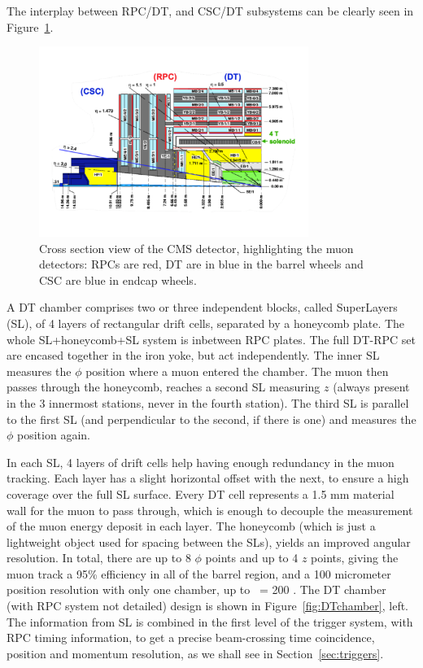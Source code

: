 
The interplay between RPC/DT, and CSC/DT subsystems can be clearly
seen in Figure~\ref{fig:muonsystem}.


\begin{figure}[htb]
  \begin{center}
    \includegraphics[width=0.78\textwidth]{Chapters/xLHCMS/muonsystem.pdf}
    \caption{Cross section view of the CMS detector, highlighting the
      muon detectors: RPCs are red, DT are in blue in the barrel
      wheels and CSC are blue in endcap wheels.}
    \label{fig:muonsystem}
  \end{center}
\end{figure}


A DT chamber comprises two or three independent blocks, called SuperLayers (SL), of
4 layers of rectangular drift cells, separated by a honeycomb
plate. The whole SL+honeycomb+SL system is inbetween RPC
plates. The full DT-RPC set are encased together in the iron yoke, but
act independently. The inner SL measures the $\phi$ position where a
muon entered the chamber. The muon then passes through the honeycomb,
reaches a second SL measuring $z$  (always
present in the 3 innermost stations, never in the fourth station). The
third SL is parallel to the first SL (and perpendicular to the second,
if there is one) and measures the $\phi$ position again.


In each SL, 4 layers of drift cells help having enough redundancy in
the muon tracking. Each layer has a slight horizontal offset with the
next, to ensure a high coverage over the full SL surface. Every DT
cell represents a 1.5 mm material wall for the muon to pass through,
which is enough to decouple the measurement of the muon energy deposit
in each layer. The honeycomb (which is just a
lightweight object used for spacing between the SLs), yields an
improved angular resolution. In total, there are up to 8 $\phi$ points
and up to 4 $z$ points, giving the muon track a 95\% efficiency in all
of the barrel region, and a 100 micrometer
position resolution with only one chamber, up to \pt~= 200 \GeVc. The
DT chamber (with RPC system not detailed) design is shown in
Figure~\ref{fig:DTchamber}, left. The
information from SL is combined in the first level of the trigger
system, with RPC timing information, to get a precise beam-crossing
time coincidence, position and momentum resolution, as we shall see in
Section~\ref{sec:triggers}.

